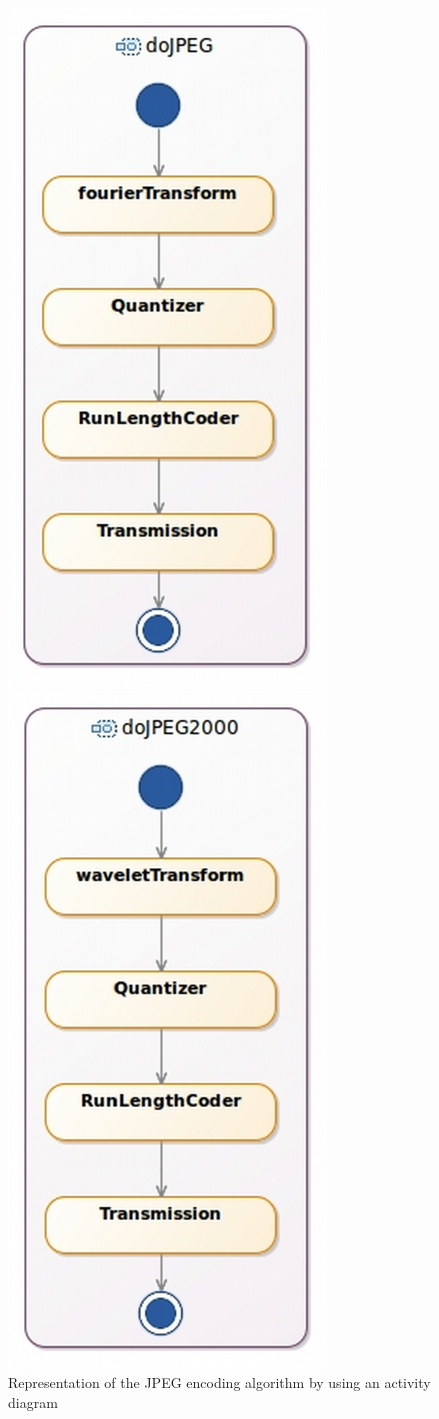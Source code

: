 	\begin{figure}[h]
		\centering
		\begin{minipage}{0.45\textwidth}
			\centering
			\includegraphics[width=.5\columnwidth]{examples/figs/dojpeg.pdf}
			\caption{Representation of the JPEG encoding algorithm by using an activity diagram}
			\label{fig:dojpeg}
		\end{minipage}\hfill
		\begin{minipage}{0.45\textwidth}
			\centering
			\includegraphics[width=.5\columnwidth]{examples/figs/dojpeg2000.pdf}

\end{minipage}
\end{figure}

